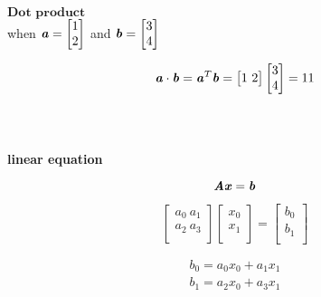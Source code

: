 \documentclass[12pt]{minimal}
\begin{document}
$\textbf{Dot product}$ \\


when 
$\textbf{\textit{a}} = 
\begin{bmatrix} 
    1\\ 
    2\\ 
\end{bmatrix}$ 
and $\textbf{\textit{b}} = 
\begin{bmatrix} 
    3\\ 
    4\\ 
\end{bmatrix}$ 

\begin{equation}
    \textbf{\textit{a}} \cdot \textbf{\textit{b}} = 
    \textbf{\textit{a}}^T\textbf{\textit{b}} = 
    \begin{bmatrix}
        1\ 2\\
    \end{bmatrix}
    \begin{bmatrix}
        3\\
        4\\
    \end{bmatrix} = 11 
\end{equation} \\ \\


\pagebreak


\textbf{linear equation}


\begin{equation}
    \textbf{\textit{A}}\textbf{\textit{x}} = \textbf{\textit{b}}
\end{equation}

\begin{equation}
    \begin{bmatrix}
        a_0\ a_1\\
        a_2\ a_3\\
    \end{bmatrix}
    \begin{bmatrix}
        x_0\\
        x_1\\
    \end{bmatrix} = 
    \begin{bmatrix}
        b_0\\
        b_1\\
    \end{bmatrix}
\end{equation}


\begin{equation}
    \begin{split}
        b_0 = a_0x_0 + a_1x_1 \\
        b_1 = a_2x_0 + a_3x_1
    \end{split}
\end{equation} \\
\end{document}
